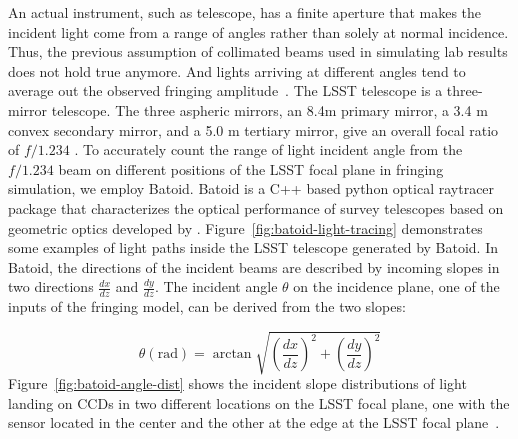 \documentclass[twocolumn]{aastex63} %
\begin{document}
\begin{CJK*}{UTF8}{gbsn}
An actual instrument, such as telescope, has a finite aperture that makes the incident light come from a range of angles rather than solely at normal incidence. Thus, the previous assumption of collimated beams used in simulating lab results does not hold true anymore. And lights arriving at different angles tend to average out the observed fringing amplitude~\citep{Groom17}. The LSST telescope is a three-mirror telescope. The three aspheric mirrors, an 8.4m primary mirror, a 3.4 m convex secondary mirror, and a 5.0 m tertiary mirror, give an overall focal ratio of $f/1.234$ \citep{Bond18,Ivezi19,Olivier08}. To accurately count the range of light incident angle from the $f/1.234$ beam on different positions of the LSST focal plane in fringing simulation, we employ Batoid. Batoid is a C++ based python optical raytracer package that characterizes the optical performance of survey telescopes based on geometric optics developed by \citet{Mayers19}. Figure~\ref{fig:batoid-light-tracing} demonstrates some examples of light paths inside the LSST telescope generated by Batoid. In Batoid, the directions of the incident beams are described by incoming slopes in two directions $\frac{dx}{dz}$ and $\frac{dy}{dz}$. The incident angle $\theta$ on the incidence plane, one of the inputs of the fringing model, can be derived from the two slopes: 

\begin{equation*}
    \theta (\mbox{rad}) = \arctan{\sqrt{\left(\frac{dx}{dz}\right)^2+\left(\frac{dy}{dz}\right)^2}}
\end{equation*}
Figure~\ref{fig:batoid-angle-dist} shows the incident slope distributions of light landing on CCDs in two different locations on the LSST focal plane, one with the sensor located in the center and the other at the edge at the LSST focal plane~\citep{Ivezi19}.



\end{CJK*}
\end{document}
